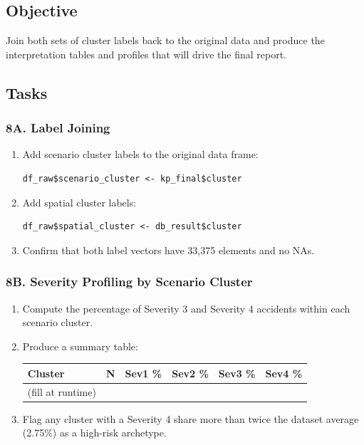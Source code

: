 \documentclass[11pt]{article}
\begin{document}
\subsection{Objective}

Join both sets of cluster labels back to the original data and produce the interpretation tables and profiles that will drive the final report.

\subsection{Tasks}

\subsubsection*{8A. Label Joining}

\begin{enumerate}
  \item Add scenario cluster labels to the original data frame:
  \begin{verbatim}
df_raw$scenario_cluster <- kp_final$cluster
  \end{verbatim}

  \item Add spatial cluster labels:
  \begin{verbatim}
df_raw$spatial_cluster <- db_result$cluster
  \end{verbatim}

  \item Confirm that both label vectors have 33,375 elements and no NAs.
\end{enumerate}

\subsubsection*{8B. Severity Profiling by Scenario Cluster}

\begin{enumerate}
  \item Compute the percentage of Severity 3 and Severity 4 accidents within each scenario cluster.
  \item Produce a summary table:

  \begin{center}
  \begin{tabular}{|l|r|r|r|r|r|}
  \hline
  \textbf{Cluster} & \textbf{N} & \textbf{Sev1 \%} & \textbf{Sev2 \%} & \textbf{Sev3 \%} & \textbf{Sev4 \%} \\
  \hline
  (fill at runtime) & & & & & \\
  \hline
  \end{tabular}
  \end{center}

  \item Flag any cluster with a Severity 4 share more than twice the dataset average (2.75\%) as a high-risk archetype.
\end{enumerate}
\end{document}

